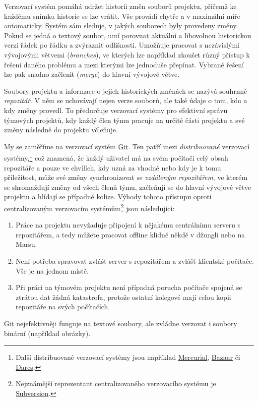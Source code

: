 \documentclass[a4paper,11pt,twoside]{article}
\theoremstyle{red}
\theoremstyle{green}
\begin{document}
    Verzovací systém pomáhá udržet historii změn souborů projektu, přičemž ke každému snímku historie se lze vrátit.
    Vše provádí chytře a v maximální míře automaticky.
    Systém sám sleduje, v jakých souborech byly provedeny změny.
    Pokud se jedná o textový soubor, umí porovnat aktuální a libovolnou historickou verzi řádek po řádku a zvýraznit odlišnosti.
    Umožňuje pracovat s nezávislými vývojovými větvemi (\emph{branches}), ve kterých lze například zkoušet různý přístup k řešení daného problému a mezi kterými lze jednoduše přepínat.
    Vybrané řešení lze pak snadno začlenit (\emph{merge}) do hlavní vývojové větve.

    Soubory projektu a informace o jejich historických změnách se nazývá souhrnně \emph{repozitář}.
    V něm se uchovávají nejen verze souborů, ale také údaje o tom, kdo a kdy změny provedl.
    To předurčuje verzovací systémy pro efektivní správu týmových projektů, kdy každý člen týmu pracuje na určité části projektu a své změny následně do projektu včleňuje.

    My se zaměříme na verzovací systém \href{https://git-scm.com}{Git}.
    Ten patří mezi \emph{distribuované} verzovací systémy,\footnote{
        Další distribuované verzovací systémy jsou například \href{https://www.mercurial-scm.org/}{Mercurial}, \href{https://bazaar.canonical.com}{Bazaar} či \href{http://darcs.net/}{Darcs}.
    } což znamená, že každý uživatel má na svém počítači celý obsah repozitáře a pouze ve chvílích, kdy uzná za vhodné nebo kdy je k tomu příležitost, může své změny synchronizovat se \emph{vzdáleným repozitářem}, ve kterém se shromažďují změny od všech členů týmu, začleňují se do hlavní vývojové větve projektu a hlídají se případné kolize.
    Výhody tohoto přístupu oproti centralizovaným verzovacím systémům\footnote{
        Nejznámější reprezentant centralizovaného verzovacího systému je \href{https://subversion.apache.org/}{Subversion}.
    } jsou následující:
    \begin{enumerate}
        \item Práce na projektu nevyžaduje připojení k nějakému centrálnímu serveru s repozitářem, a tedy můžete pracovat offline klidně někdě v džungli nebo na Marsu.
        \item Není potřeba spravovat zvlášť server s repozitářem a zvlášť klientské počítače. Vše je na jednom místě.
        \item Při práci na týmovém projektu není případná porucha počítače spojená se ztrátou dat žádná katastrofa, protože ostatní kolegové mají celou kopii repozitáře na svých počítačích.
    \end{enumerate}
    Git nejefektivněji funguje na textové soubory, ale zvládne verzovat i soubory binární (například obrázky).
\end{document}
